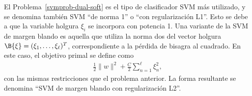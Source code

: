 El Problema~\ref{svmprob-dual-soft} es el tipo de clasificador SVM más
utilizado, y se denomina también SVM ``de norma 1'' o ``con
regularización L1''.
Esto se debe a que la variable holgura $\xi_i$ se incorpora con
potencia 1.
Una variante de la SVM de margen blando es aquella que utiliza la
norma dos del vector holgura $\B{\xi}=(\xi_1,\ldots,\xi_\ell)^T$,
correspondiente a la pérdida de bisagra al cuadrado.
En este caso, el objetivo primal se define como
%
\begin{align}\label{svm-l2}
  \frac{1}{2}\|w\|^2+\frac{C}{2}\sum_{n=1}^{\ell}\xi_n^2,
\end{align}
%
con las mismas restricciones que el problema anterior.
La forma resultante se denomina ``SVM de margen blando con
regularización L2''.
